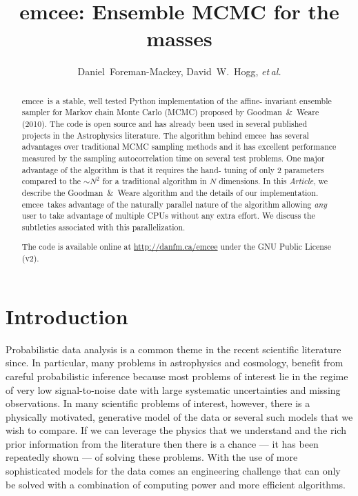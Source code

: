\documentclass[12pt,preprint]{aastex}
\newcommand{\project}[1]{{\sffamily #1}}
\newcommand{\thisplain}{emcee}
\newcommand{\this}{\project{\thisplain}}
\newcommand{\paper}{\emph{Article}}
\newcommand{\license}{GNU Public License (v2)}
\newcommand{\foreign}[1]{\emph{#1}}
\newcommand{\etal}{\foreign{et\,al.}}
\begin{document}
\title{\this: Ensemble MCMC for the masses}
\author{Daniel~Foreman-Mackey, David~W.~Hogg, \etal}

\begin{abstract}

    \this~is a stable, well tested Python implementation of the affine-%
    invariant ensemble sampler for Markov chain Monte Carlo (MCMC)
    proposed by Goodman~\&~Weare (2010). The code is open source and has
    already been used in several published projects in the Astrophysics
    literature. The algorithm behind \this~has several advantages over
    traditional MCMC sampling methods and it has excellent performance
    measured by the sampling autocorrelation time on several test problems.
    One major advantage of the algorithm is that it requires the hand-%
    tuning of only 2 parameters compared to the $\sim N^2$ for
    a traditional algorithm in $N$ dimensions. In this \paper, we describe
    the Goodman~\&~Weare algorithm and the details of our implementation.
    \this~takes advantage of the naturally parallel nature of the algorithm
    allowing \emph{any} user to take advantage of multiple CPUs without any
    extra effort. We discuss the subtleties associated with this
    parallelization.

    The code is available online at \url{http://danfm.ca/\thisplain} under the
    \license.

\end{abstract}


\section{Introduction}

Probabilistic data analysis is a common theme in the recent scientific
literature since. In particular, many problems in astrophysics and cosmology,
benefit from careful probabilistic inference because most problems of
interest lie in the regime of very low signal-to-noise date with large
systematic uncertainties and missing observations. In many scientific
problems of interest, however, there is a physically motivated,
generative model of the data or several
such models that we wish to compare. If we can leverage the physics that we
understand and the rich prior information from the literature then there is
a chance --- it has been repeatedly shown --- of solving these problems.
With the use of more sophisticated models for the data comes an engineering
challenge that can only be solved with a combination of computing power and
more efficient algorithms.
\end{document}
